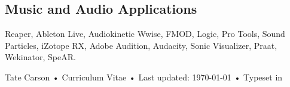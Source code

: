 \documentclass[12pt, a4paper]{article}
\begin{document}
\subsection*{Music and Audio Applications}
Reaper, Ableton Live, Audiokinetic Wwise, FMOD, Logic, Pro Tools, Sound Particles, iZotope RX, Adobe Audition, Audacity, Sonic Visualizer, Praat, Wekinator, SpeAR. \\



\vfill{}

\begin{center}
{\scriptsize  Tate Carson •\- Curriculum Vitae •\- Last updated: \today\- •\- %
Typeset in \href{http://nitens.org/taraborelli/cvtex}{
\XeTeX }\\
}
\end{center}
\end{document}

